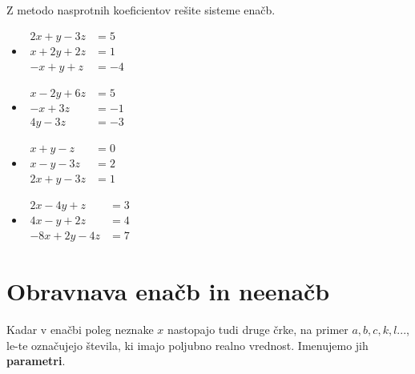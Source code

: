         
            \begin{naloga}
                Z metodo nasprotnih koeficientov rešite sisteme enačb.
                \begin{itemize}
                    
                        \item $\begin{aligned}
                            2x+y-3z&=5 \\ x+2y+2z&=1 \\ -x+y+z&=-4
                        \end{aligned}$ 
                        \item $\begin{aligned}
                            x-2y+6z&=5 \\ -x+3z&=-1 \\ 4y-3z&=-3
                        \end{aligned}$ 
                        \item $\begin{aligned}
                            x+y-z&=0 \\ x-y-3z&=2 \\ 2x+y-3z&=1
                        \end{aligned}$ 
                        \item $\begin{aligned}
                            2x-4y+z&=3 \\ 4x-y+2z&=4 \\ -8x+2y-4z&=7
                        \end{aligned}$ 
                    

                \end{itemize}
            \end{naloga}
        





            \newpage
    \section{Obravnava enačb in neenačb}

        

            
                Kadar v enačbi poleg neznake $x$ nastopajo tudi druge črke, na primer $a, b, c, k, l ...$, 
                le-te označujejo števila, ki imajo poljubno realno vrednost. Imenujemo jih \textbf{parametri}.
            
